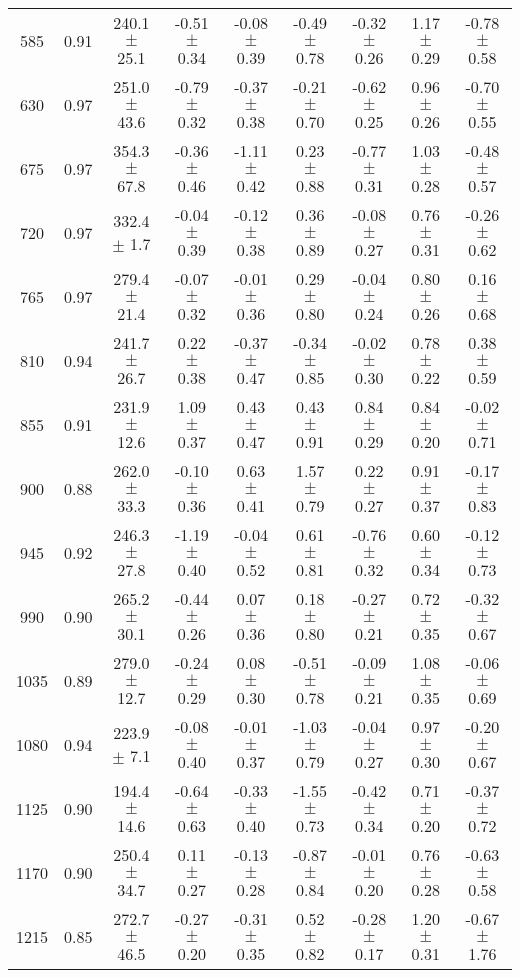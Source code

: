 \documentclass[twocolumn]{aastex61}%
\begin{document}
\begin{table}[ht]
\begin{tabular}{ccc|ccccc|c}
585 & 0.91 & 240.1 $\pm$ 25.1 & -0.51 $\pm$ 0.34 & -0.08 $\pm$ 0.39 & -0.49 $\pm$ 0.78 & -0.32 $\pm$ 0.26 & 1.17 $\pm$ 0.29 & -0.78 $\pm$ 0.58\\
630 & 0.97 & 251.0 $\pm$ 43.6 & -0.79 $\pm$ 0.32 & -0.37 $\pm$ 0.38 & -0.21 $\pm$ 0.70 & -0.62 $\pm$ 0.25 & 0.96 $\pm$ 0.26 & -0.70 $\pm$ 0.55\\
675 & 0.97 & 354.3 $\pm$ 67.8 & -0.36 $\pm$ 0.46 & -1.11 $\pm$ 0.42 & 0.23 $\pm$ 0.88 & -0.77 $\pm$ 0.31 & 1.03 $\pm$ 0.28 & -0.48 $\pm$ 0.57\\
720 & 0.97 & 332.4 $\pm$ 1.7 & -0.04 $\pm$ 0.39 & -0.12 $\pm$ 0.38 & 0.36 $\pm$ 0.89 & -0.08 $\pm$ 0.27 & 0.76 $\pm$ 0.31 & -0.26 $\pm$ 0.62\\
765 & 0.97 & 279.4 $\pm$ 21.4 & -0.07 $\pm$ 0.32 & -0.01 $\pm$ 0.36 & 0.29 $\pm$ 0.80 & -0.04 $\pm$ 0.24 & 0.80 $\pm$ 0.26 & 0.16 $\pm$ 0.68\\
810 & 0.94 & 241.7 $\pm$ 26.7 & 0.22 $\pm$ 0.38 & -0.37 $\pm$ 0.47 & -0.34 $\pm$ 0.85 & -0.02 $\pm$ 0.30 & 0.78 $\pm$ 0.22 & 0.38 $\pm$ 0.59\\
855 & 0.91 & 231.9 $\pm$ 12.6 & 1.09 $\pm$ 0.37 & 0.43 $\pm$ 0.47 & 0.43 $\pm$ 0.91 & 0.84 $\pm$ 0.29 & 0.84 $\pm$ 0.20 & -0.02 $\pm$ 0.71\\
900 & 0.88 & 262.0 $\pm$ 33.3 & -0.10 $\pm$ 0.36 & 0.63 $\pm$ 0.41 & 1.57 $\pm$ 0.79 & 0.22 $\pm$ 0.27 & 0.91 $\pm$ 0.37 & -0.17 $\pm$ 0.83\\
945 & 0.92 & 246.3 $\pm$ 27.8 & -1.19 $\pm$ 0.40 & -0.04 $\pm$ 0.52 & 0.61 $\pm$ 0.81 & -0.76 $\pm$ 0.32 & 0.60 $\pm$ 0.34 & -0.12 $\pm$ 0.73\\
990 & 0.90 & 265.2 $\pm$ 30.1 & -0.44 $\pm$ 0.26 & 0.07 $\pm$ 0.36 & 0.18 $\pm$ 0.80 & -0.27 $\pm$ 0.21 & 0.72 $\pm$ 0.35 & -0.32 $\pm$ 0.67\\
1035 & 0.89 & 279.0 $\pm$ 12.7 & -0.24 $\pm$ 0.29 & 0.08 $\pm$ 0.30 & -0.51 $\pm$ 0.78 & -0.09 $\pm$ 0.21 & 1.08 $\pm$ 0.35 & -0.06 $\pm$ 0.69\\
1080 & 0.94 & 223.9 $\pm$ 7.1 & -0.08 $\pm$ 0.40 & -0.01 $\pm$ 0.37 & -1.03 $\pm$ 0.79 & -0.04 $\pm$ 0.27 & 0.97 $\pm$ 0.30 & -0.20 $\pm$ 0.67\\
1125 & 0.90 & 194.4 $\pm$ 14.6 & -0.64 $\pm$ 0.63 & -0.33 $\pm$ 0.40 & -1.55 $\pm$ 0.73 & -0.42 $\pm$ 0.34 & 0.71 $\pm$ 0.20 & -0.37 $\pm$ 0.72\\
1170 & 0.90 & 250.4 $\pm$ 34.7 & 0.11 $\pm$ 0.27 & -0.13 $\pm$ 0.28 & -0.87 $\pm$ 0.84 & -0.01 $\pm$ 0.20 & 0.76 $\pm$ 0.28 & -0.63 $\pm$ 0.58\\
1215 & 0.85 & 272.7 $\pm$ 46.5 & -0.27 $\pm$ 0.20 & -0.31 $\pm$ 0.35 & 0.52 $\pm$ 0.82 & -0.28 $\pm$ 0.17 & 1.20 $\pm$ 0.31 & -0.67 $\pm$ 1.76\\

\end{tabular}
\end{table}
\end{document}
